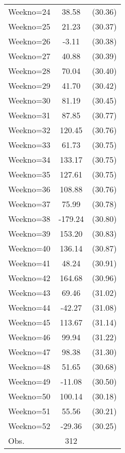 {\begin{tabular}{l*{1}{cc}}
Weekno=24       &    38.58&  (30.36)\\
Weekno=25       &    21.23&  (30.37)\\
Weekno=26       &    -3.11&  (30.38)\\
Weekno=27       &    40.88&  (30.39)\\
Weekno=28       &    70.04&  (30.40)\\
Weekno=29       &    41.70&  (30.42)\\
Weekno=30       &    81.19&  (30.45)\\
Weekno=31       &    87.85&  (30.77)\\
Weekno=32       &   120.45&  (30.76)\\
Weekno=33       &    61.73&  (30.75)\\
Weekno=34       &   133.17&  (30.75)\\
Weekno=35       &   127.61&  (30.75)\\
Weekno=36       &   108.88&  (30.76)\\
Weekno=37       &    75.99&  (30.78)\\
Weekno=38       &  -179.24&  (30.80)\\
Weekno=39       &   153.20&  (30.83)\\
Weekno=40       &   136.14&  (30.87)\\
Weekno=41       &    48.24&  (30.91)\\
Weekno=42       &   164.68&  (30.96)\\
Weekno=43       &    69.46&  (31.02)\\
Weekno=44       &   -42.27&  (31.08)\\
Weekno=45       &   113.67&  (31.14)\\
Weekno=46       &    99.94&  (31.22)\\
Weekno=47       &    98.38&  (31.30)\\
Weekno=48       &    51.65&  (30.68)\\
Weekno=49       &   -11.08&  (30.50)\\
Weekno=50       &   100.14&  (30.18)\\
Weekno=51       &    55.56&  (30.21)\\
Weekno=52       &   -29.36&  (30.25)\\
\hline
Obs.            &      312&         \\
\hline\hline
\end{tabular}
}
